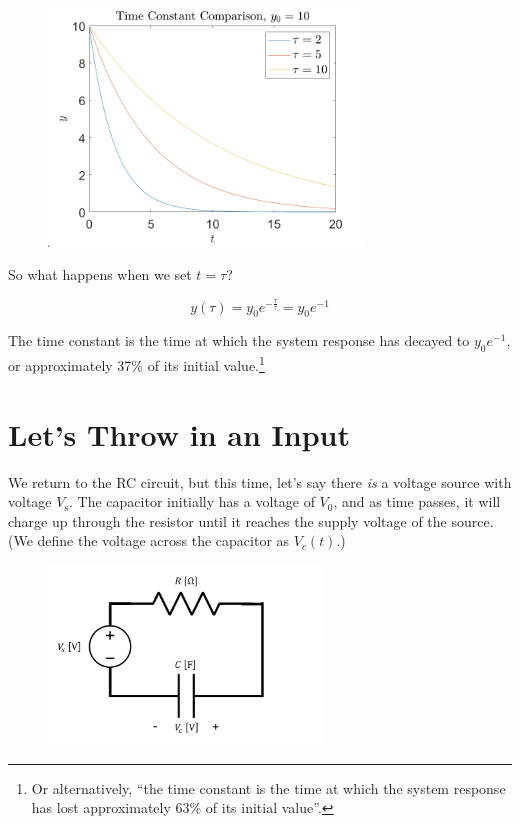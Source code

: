 \documentclass[
  letterpaper,
  DIV=11,
  numbers=noendperiod]{scrreprt}
\begin{document}
\begin{figure}

{\centering \includegraphics[width=0.75\textwidth,height=\textheight]{figs/2_tc.png}

}

\end{figure}

So what happens when we set \(t=\tau\)?

\[y(\tau) = y_0 e^{-\frac{\tau}{\tau}} = y_0 e^{-1}\]

The time constant is the time at which the system response has decayed
to \(y_0 e^{-1}\), or approximately 37\% of its initial
value.\footnote{Or alternatively, ``the time constant is the time at
  which the system response has lost approximately 63\% of its initial
  value''.}

\hypertarget{lets-throw-in-an-input}{%
\section{Let's Throw in an Input}\label{lets-throw-in-an-input}}

We return to the RC circuit, but this time, let's say there \emph{is} a
voltage source with voltage \(V_\text{s}\). The capacitor initially has
a voltage of \(V_0\), and as time passes, it will charge up through the
resistor until it reaches the supply voltage of the source. (We define
the voltage across the capacitor as \(V_c(t)\).)

\begin{figure}

{\centering \includegraphics[width=0.65\textwidth,height=\textheight]{figs/2_circ2.png}

}

\end{figure}
\end{document}
